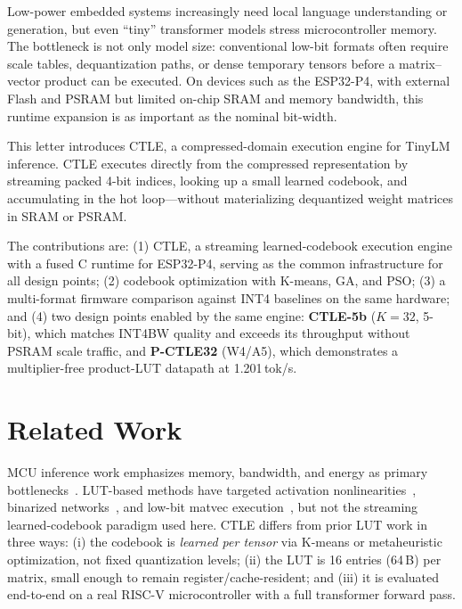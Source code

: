 \documentclass[10pt,journal]{IEEEtran}
\begin{document}
Low-power embedded systems increasingly need local language understanding or
generation, but even ``tiny'' transformer models stress microcontroller memory.
The bottleneck is not only model size: conventional low-bit formats often
require scale tables, dequantization paths, or dense temporary tensors before a
matrix--vector product can be executed. On devices such as the ESP32-P4, with
external Flash and PSRAM but limited on-chip SRAM and memory bandwidth, this
runtime expansion is as important as the nominal bit-width.

This letter introduces CTLE, a compressed-domain execution engine for TinyLM
inference. CTLE executes directly from the compressed representation by
streaming packed 4-bit indices, looking up a small learned codebook, and
accumulating in the hot loop---without materializing dequantized weight matrices
in SRAM or PSRAM.

The contributions are: (1) CTLE, a streaming learned-codebook execution engine
with a fused C runtime for ESP32-P4, serving as the common infrastructure for
all design points; (2) codebook optimization with K-means, GA, and PSO;
(3) a multi-format firmware comparison against INT4 baselines on the same
hardware; and (4) two design points enabled by the same engine:
\textbf{CTLE-5b} ($K\!=\!32$, 5-bit), which matches INT4BW quality and exceeds
its throughput without PSRAM scale traffic, and \textbf{P-CTLE32} (W4/A5),
which demonstrates a multiplier-free product-LUT datapath at 1.201\,tok/s.


\section{Related Work}

MCU inference work emphasizes memory, bandwidth, and energy as primary
bottlenecks~\cite{Saha2022,Novac2021,Elhanashi2024}. LUT-based methods have
targeted activation nonlinearities~\cite{Rezk2020,Rusci2022}, binarized
networks~\cite{Sakr2023}, and low-bit matvec execution~\cite{Lin2024}, but
not the streaming learned-codebook paradigm used here. CTLE differs from prior
LUT work in three ways: (i) the codebook is \emph{learned per tensor} via
K-means or metaheuristic optimization, not fixed quantization levels; (ii) the
LUT is 16 entries (64\,B) per matrix, small enough to remain register/cache-resident;
and (iii) it is evaluated end-to-end on a real RISC-V microcontroller with a
full transformer forward pass.
\end{document}
